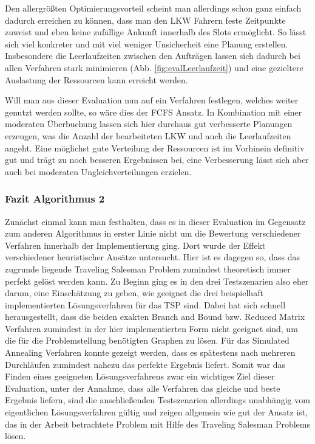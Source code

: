 Den allergrößten Optimierungsvorteil scheint man allerdings schon ganz einfach dadurch erreichen zu können, dass man den LKW Fahrern feste Zeitpunkte zuweist und eben keine zufällige Ankunft innerhalb des Slots ermöglicht. So lässt sich viel konkreter und mit viel weniger Unsicherheit eine Planung erstellen. 
Insbesondere die Leerlaufzeiten zwischen den Aufträgen lassen sich dadurch bei allen Verfahren stark minimieren (Abb. \ref{fig:evalLeerlaufzeit}) und eine gezieltere Auslastung der Ressourcen kann erreicht werden.

Will man aus dieser Evaluation nun auf ein Verfahren festlegen, welches weiter genutzt werden sollte, so wäre dies der FCFS Ansatz. In Kombination mit einer moderaten Überbuchung lassen sich hier durchaus gut verbesserte Planungen erzeugen, was die Anzahl der bearbeiteten LKW und auch die Leerlaufzeiten angeht. Eine möglichst gute Verteilung der Ressourcen ist im Vorhinein definitiv gut und trägt zu noch besseren Ergebnissen bei, eine Verbesserung lässt sich aber auch bei moderaten Ungleichverteilungen erzielen.

\subsubsection{Fazit Algorithmus 2}

Zunächst einmal kann man festhalten, dass es in dieser Evaluation im Gegensatz zum anderen Algorithmus in erster Linie nicht um die Bewertung verschiedener Verfahren innerhalb der Implementierung ging. Dort wurde der Effekt verschiedener heuristischer Ansätze untersucht. Hier ist es dagegen so, dass das zugrunde liegende Traveling Salesman Problem zumindest theoretisch immer perfekt gelöst werden kann. Zu Beginn ging es in den drei Testszenarien also eher darum, eine Einschätzung zu geben, wie geeignet die drei beispielhaft implementierten Lösungsverfahren für das TSP sind. Dabei hat sich schnell herausgestellt, dass die beiden exakten Branch and Bound bzw. Reduced Matrix Verfahren zumindest in der hier implementierten Form nicht geeignet sind, um die für die Problemstellung benötigten Graphen zu lösen. Für das Simulated Annealing Verfahren konnte gezeigt werden, dass es spätestens nach mehreren Durchläufen zumindest nahezu das perfekte Ergebnis liefert. Somit war das Finden eines geeigneten Lösungsverfahrens zwar ein wichtiges Ziel dieser Evaluation, unter der Annahme, dass alle Verfahren das gleiche und beste Ergebnis liefern, sind die anschließenden Testszenarien allerdings unabhängig vom eigentlichen Lösungsverfahren gültig und zeigen allgemein wie gut der Ansatz ist, das in der Arbeit betrachtete Problem mit Hilfe des Traveling Salesman Problems lösen.

